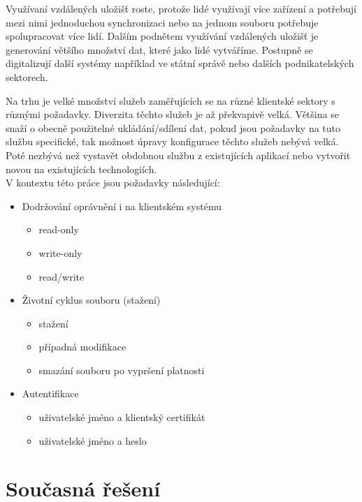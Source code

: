 Využívaní vzdálených uložišť roste, protože lidé využívají více zařízení a potřebují mezi nimi jednoduchou synchronizaci nebo na jednom souboru potřebuje spolupracovat
více lidí. Dalším podnětem využívání vzdálených uložišť je generování většího množství dat, které jako lidé vytváříme. Postupně se digitalizují další systémy například 
ve státní správě nebo dalších podnikatelských sektorech. 

Na trhu je velké množství služeb zaměřujících se na různé klientské sektory s různými požadavky. Diverzita těchto služeb je až překvapivě velká. Většina se snaží
o obecně použitelné ukládání/sdílení dat, pokud jsou požadavky na tuto službu specifické, tak možnost úpravy konfigurace těchto služeb nebývá velká. Poté nezbývá než vystavět
obdobnou službu z existujících aplikací nebo vytvořit novou na existujících technologiích.\\

\noindent V kontextu této práce jsou požadavky následující: 

\begin{itemize}
    \item Dodržování oprávnění i na klientském systému
    \begin{itemize}
        \item read-only
        \item write-only
        \item read/write
    \end{itemize}
    \item Životní cyklus souboru (stažení)
    \begin{itemize}
        \item stažení
        \item případná modifikace
        \item smazání souboru po vypršení platnosti
    \end{itemize}
    \item Autentifikace
    \begin{itemize}
        \item uživatelské jméno a klientský certifikát
        \item uživatelské jméno a heslo
    \end{itemize}
\end{itemize}

\section{Současná řešení}

